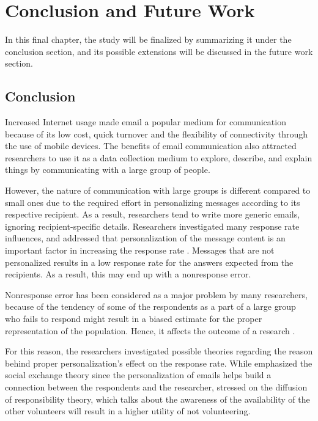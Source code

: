 \chapter{Conclusion and Future Work}
\label{chp:6:ConcFutu}

In this final chapter, the study will be finalized by summarizing it under the conclusion section, and its possible extensions will be discussed in the future work section.

\section{Conclusion}
\label{sec:6.1:Conc}

Increased Internet usage made email a popular medium for communication because of its low cost, quick turnover and the flexibility of connectivity through the use of mobile devices. The benefits of email communication also attracted researchers to use it as a data collection medium to explore, describe, and explain things by communicating with a large group of people.
\vspace{1cm}

However, the nature of communication with large groups is different compared to small ones due to the required effort in personalizing messages according to its respective recipient. As a result, researchers tend to write more generic emails, ignoring recipient-specific details. Researchers investigated many response rate influences, and addressed that personalization of the message content is an important factor in increasing the response rate \citep{Dillman1991,Schaefer1998}. Messages that are not personalized results in a low response rate for the answers expected from the recipients. As a result, this may end up with a nonresponse error.
\vspace{1cm}

Nonresponse error has been considered as a major problem by many researchers, because of the tendency of some of the respondents as a part of a large group who fails to respond might result in a biased estimate for the proper representation of the population. Hence, it affects the outcome of a research \citep{Bogen1996}.
\vspace{1cm}

For this reason, the researchers investigated possible theories regarding the reason behind proper personalization's effect on the response rate. While \cite{DillmanDonA.SmythJoleneD.Christian2009} emphasized the social exchange theory since the personalization of emails helps build a connection between the respondents and the researcher, \cite{Barron2002} stressed on the diffusion of responsibility theory, which talks about the awareness of the availability of the other volunteers will result in a higher utility of not volunteering.
\vspace{1cm}

